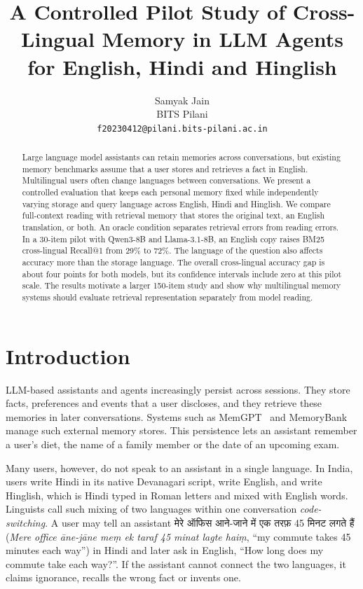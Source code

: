 \documentclass[11pt]{article}
\title{A Controlled Pilot Study of Cross-Lingual Memory in LLM Agents\\
for English, Hindi and Hinglish}
\author{Samyak Jain \\
        BITS Pilani \\
        \texttt{f20230412@pilani.bits-pilani.ac.in}}
\newcommand{\hi}[1]{\foreignlanguage{hindi}{#1}}
\begin{document}
\maketitle

\begin{abstract}
Large language model assistants can retain memories across conversations, but existing memory benchmarks assume that a user stores and retrieves a fact in English. Multilingual users often change languages between conversations. We present a controlled evaluation that keeps each personal memory fixed while independently varying storage and query language across English, Hindi and Hinglish. We compare full-context reading with retrieval memory that stores the original text, an English translation, or both. An oracle condition separates retrieval errors from reading errors. In a 30-item pilot with Qwen3-8B and Llama-3.1-8B, an English copy raises BM25 cross-lingual Recall@1 from 29\% to 72\%. The language of the question also affects accuracy more than the storage language. The overall cross-lingual accuracy gap is about four points for both models, but its confidence intervals include zero at this pilot scale. The results motivate a larger 150-item study and show why multilingual memory systems should evaluate retrieval representation separately from model reading.
\end{abstract}

\section{Introduction}
\label{sec:intro}

LLM-based assistants and agents increasingly persist across sessions.
They store facts, preferences and events that a user discloses, and they retrieve these memories in later conversations.
Systems such as MemGPT~\citep{packer2023memgpt} and MemoryBank~\citep{zhong2024memorybank} manage such external memory stores.
This persistence lets an assistant remember a user's diet, the name of a family member or the date of an upcoming exam.

Many users, however, do not speak to an assistant in a single language.
In India, users write Hindi in its native Devanagari script, write English, and write Hinglish, which is Hindi typed in Roman letters and mixed with English words.
Linguists call such mixing of two languages within one conversation \emph{code-switching}.
A user may tell an assistant \hi{मेरे ऑफिस आने-जाने में एक तरफ़ 45 मिनट लगते हैं} (\emph{Mere office āne-jāne meṃ ek taraf 45 minat lagte haiṃ}, ``my commute takes 45 minutes each way'') in Hindi and later ask in English, ``How long does my commute take each way?''.
If the assistant cannot connect the two languages, it claims ignorance, recalls the wrong fact or invents one.
\end{document}
